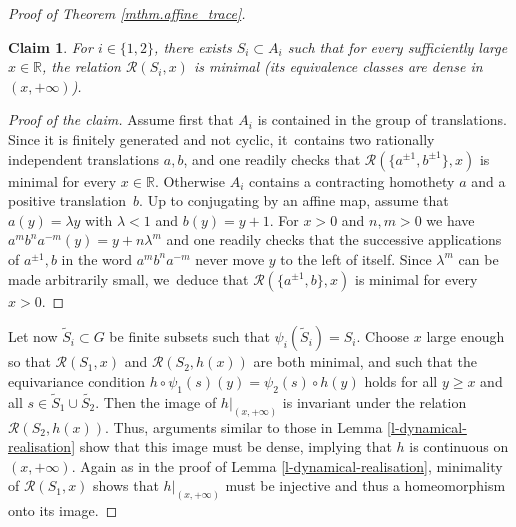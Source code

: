 \documentclass[JEP,XML,SOM,Unicode,NoFloatCountersInSection,published]{cedram}
\newtheorem*{claim}{Claim}
\theoremstyle{definition}
\newcommand{\R}{\mathbb{R}}
\begin{document}
\begin{proof}[Proof of Theorem \ref{mthm.affine_trace}]
\begin{claim}
For $i\in \{1, 2\}$, there exists $S_i\subset A_i$ such that for every sufficiently large $x\in \R$, the relation $\mathcal{R}(S_i, x)$ is minimal (\ie its equivalence classes are dense in $(x, +\infty)$).
\end{claim}
\begin{proof}[Proof of the claim]
Assume first that $A_i$ is contained in the group of translations. Since it is finitely generated and not cyclic, it~contains two rationally independent translations $a, b$, and one readily checks that $\mathcal{R}(\{a^{\pm1 }, b^{\pm 1}\}, x)$ is minimal for every $x\in \R$. Otherwise $A_i$ contains a contracting homothety $a$ and a positive translation~$b$. Up to conjugating by an affine map, assume that $a(y)=\lambda y$ with $\lambda<1$ and $b(y)=y+1$. For $x>0$ and $n, m>0$ we have $a^m b^na^{-m}(y)=y+n\lambda^{m}$ and one readily checks that the successive applications of $a^{\pm 1}, b$ in the word $a^m b^na^{-m}$ never move $y$ to the left of itself. Since $\lambda^m$ can be made arbitrarily small, we~deduce that $\mathcal{R}(\{a^{\pm 1}, b\}, x)$ is minimal for every $x>0$.
\end{proof}

Let now $\tilde{S}_i\subset G$ be finite subsets such that $\psi_i(\tilde{S}_i)=S_i$. Choose $x$ large enough so that $\mathcal{R}(S_1, x)$ and $\mathcal{R}(S_2, h(x))$ are both minimal, and such that the equivariance condition $h\circ \psi_1(s)(y)=\psi_2(s)\circ h(y)$ holds for all $y\ge x$ and all $s\in \tilde{S}_1\cup \tilde{S_2}$. Then the image of $h|_{(x, +\infty)}$ is invariant under the relation $\mathcal{R}(S_2, h(x))$. Thus, arguments similar to those in Lemma \ref{l-dynamical-realisation} show that this image must be dense, implying that $h$ is continuous on $(x, +\infty)$. Again as in the proof of Lemma \ref{l-dynamical-realisation}, minimality of $\mathcal{R}(S_1, x)$ shows that $h|_{(x, +\infty)}$ must be injective and thus a homeomorphism onto its image.


\end{proof}
\end{document}
